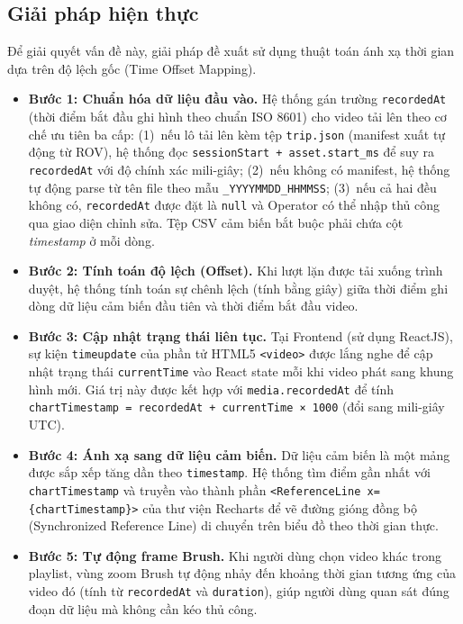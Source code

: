 \documentclass[../DoAn.tex]{subfiles}
\begin{document}
\subsection{Giải pháp hiện thực}
Để giải quyết vấn đề này, giải pháp đề xuất sử dụng thuật toán ánh xạ thời gian dựa trên độ lệch gốc (Time Offset Mapping). 
\begin{itemize}
    \item \textbf{Bước 1: Chuẩn hóa dữ liệu đầu vào.} Hệ thống gán trường \texttt{recordedAt} (thời điểm bắt đầu ghi hình theo chuẩn ISO 8601) cho video tải lên theo cơ chế ưu tiên ba cấp: (1)~nếu lô tải lên kèm tệp \texttt{trip.json} (manifest xuất tự động từ ROV), hệ thống đọc \texttt{sessionStart +\allowbreak{} asset.start\_ms} để suy ra \texttt{recordedAt} với độ chính xác mili-giây; (2)~nếu không có manifest, hệ thống tự động parse từ tên file theo mẫu \texttt{\_YYYYMMDD\_HHMMSS}; (3)~nếu cả hai đều không có, \texttt{recordedAt} được đặt là \texttt{null} và Operator có thể nhập thủ công qua giao diện chỉnh sửa. Tệp CSV cảm biến bắt buộc phải chứa cột \textit{timestamp} ở mỗi dòng.
    \item \textbf{Bước 2: Tính toán độ lệch (Offset).} Khi lượt lặn được tải xuống trình duyệt, hệ thống tính toán sự chênh lệch (tính bằng giây) giữa thời điểm ghi dòng dữ liệu cảm biến đầu tiên và thời điểm bắt đầu video.
    \item \textbf{Bước 3: Cập nhật trạng thái liên tục.} Tại Frontend (sử dụng ReactJS), sự kiện \texttt{timeupdate} của phần tử HTML5 \texttt{<video>} được lắng nghe để cập nhật trạng thái \texttt{currentTime} vào React state mỗi khi video phát sang khung hình mới. Giá trị này được kết hợp với \texttt{media.recordedAt} để tính \texttt{chartTimestamp =\allowbreak{} recordedAt + currentTime × 1000} (đổi sang mili-giây UTC).
    \item \textbf{Bước 4: Ánh xạ sang dữ liệu cảm biến.} Dữ liệu cảm biến là một mảng được sắp xếp tăng dần theo \texttt{timestamp}. Hệ thống tìm điểm gần nhất với \texttt{chartTimestamp} và truyền vào thành phần \texttt{<ReferenceLine\allowbreak{} x=\{chartTimestamp\}>} của thư viện Recharts để vẽ đường gióng đồng bộ (Synchronized Reference Line) di chuyển trên biểu đồ theo thời gian thực.
    \item \textbf{Bước 5: Tự động frame Brush.} Khi người dùng chọn video khác trong playlist, vùng zoom Brush tự động nhảy đến khoảng thời gian tương ứng của video đó (tính từ \texttt{recordedAt} và \texttt{duration}), giúp người dùng quan sát đúng đoạn dữ liệu mà không cần kéo thủ công.
\end{itemize}
\end{document}
